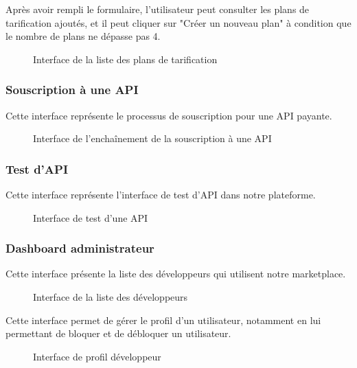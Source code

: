     Après avoir rempli le formulaire, l'utilisateur peut consulter les plans de tarification ajoutés, et il peut cliquer sur "Créer un nouveau plan" à condition que le nombre de plans ne dépasse pas 4. 
    \begin{figure}[H]
        \centering
        \caption{ Interface de la liste des plans de tarification }
        \label{fig:logo_tt}
    \end{figure}

    \subsubsection{Souscription à une API }
    Cette interface représente le processus de souscription pour une API payante.
    \begin{figure}[H]
        \centering
        \caption{Interface de l'enchaînement de la souscription à une API }
        \label{fig:logo_tt}
    \end{figure}
    \pagebreak
    \subsubsection{Test d'API}
    Cette interface représente l'interface de test d'API dans notre plateforme.
    \begin{figure}[H]
        \centering
        \caption{Interface de test d'une API}
        \label{fig:logo_tt}
    \end{figure}
    
    \subsubsection{Dashboard administrateur}
    Cette interface présente la liste des développeurs qui utilisent notre marketplace.       
        \begin{figure}[H]    
        \centering
            \caption{Interface de la liste des développeurs }
            \label{fig:logo_tt}
        \end{figure}

        Cette interface permet de gérer le profil d'un utilisateur, notamment en lui permettant de bloquer et de débloquer un utilisateur.
        \begin{figure}[H]    
        \centering
            \caption{Interface de profil développeur }
            \label{fig:logo_tt}
        \end{figure}



